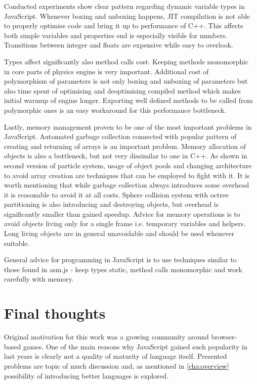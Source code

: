 Conducted experiments show clear pattern regarding dynamic variable types in JavaScript. Whenever boxing and unboxing happens, JIT compilation is not able to properly optimise code and bring it up to performance of C++. This affects both simple variables and properties end is especially visible for numbers. Transitions between integer and floats are expensive while easy to overlook.

Types affect significantly also method calls cost. Keeping methods monomorphic in core parts of physics engine is very important. Additional cost of polymorphism of parameters is not only boxing and unboxing of parameters but also time spent of optimising and deoptimising compiled method which makes initial warmup of engine longer. Exporting well defined methods to be called from polymorphic ones is an easy workaround for this performance bottleneck.

Lastly, memory management proven to be one of the most important problems in JavaScript. Automated garbage collection connected with popular pattern of creating and returning of arrays is an important problem. Memory allocation of objects is also a bottleneck, but not very dissimilar to one in C++. As shown in second version of particle system, usage of object pools and changing architecture to avoid array creation are techniques that can be employed to fight with it. It is worth mentioning that while garbage collection always introduces some overhead it is reasonable to avoid it at all costs. Sphere collision system with octree partitioning is also introducing and destroying objects, but overhead is significantly smaller than gained speedup. Advice for memory operations is to avoid objects living only for a single frame i.e. temporary variables and helpers. Long living objects are in general unavoidable and should be used whenever suitable.

General advice for programming in JavaScript is to use techniques similar to those found in asm.js - keep types static, method calls monomorphic and work carefully with memory.

\section{Final thoughts}
\label{sec:final}

Original motivation for this work was a growing community around browser-based games. One of the main reasons why JavaScript gained such popularity in last years is clearly not a quality of maturity of language itself. Presented problems are topic of much discussion and, as mentioned in \ref{cha:overview} possibility of introducing better languages is explored.


